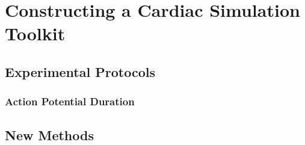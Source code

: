 \chapter{Constructing a Cardiac Simulation Toolkit}

\section{Experimental Protocols}



\subsection{Action Potential Duration}

\section{New Methods}
